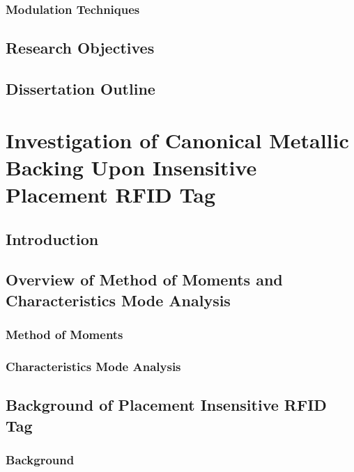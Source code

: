 \documentclass[12pt,onecolumn]{report}
\begin{document}
        \subsection{Modulation Techniques}
            
    \section{Research Objectives}
        
    \section{Dissertation Outline}
        
        
\chapter{Investigation of Canonical Metallic Backing Upon  Insensitive Placement RFID Tag}
    \section{Introduction}
    \section{Overview of Method of Moments and Characteristics Mode Analysis}
        \subsection{Method of Moments}
        \subsection{Characteristics Mode Analysis}
    \section{Background of Placement Insensitive  RFID Tag}
        \subsection{Background}
\end{document}
